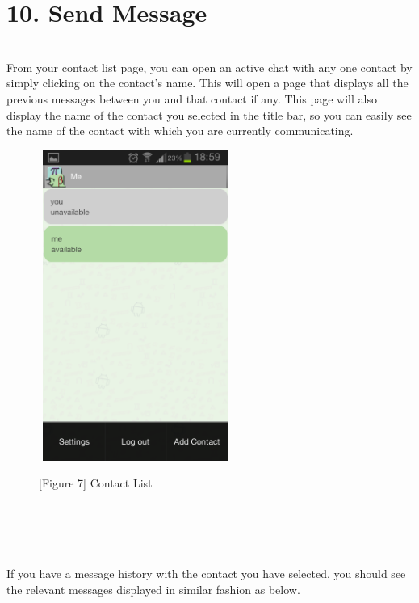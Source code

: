 \documentclass[29pt,a4paper]{moderncv}
\begin{document}
				\vspace{4mm}
				
		\section*{10. Send Message}
				\vspace{5mm}
				\\From your contact list page, you can open an active chat with any one contact by simply clicking on the contact’s name.  This will open a page that displays all the previous messages between you and that contact if any.  This page will also display the name of the contact you selected in the title bar, so you can easily see the name of the contact with which you are currently communicating.\\
				
				\noindent\begin{figure}
								\centering
								\includegraphics[width=2.5in, height=4.0in]{./Screenshot_2013-10-23-18-59-23.png} \\
								\centering \caption{[Figure 7] Contact List}
								\end{figure}\\
				
				\\[Note: Green contacts, are online contacts, grey contacts are offline contacts.]\\
				
				\\If you have a message history with the contact you have selected, you should see the relevant messages displayed in similar fashion as below.\\
				
\end{document}

